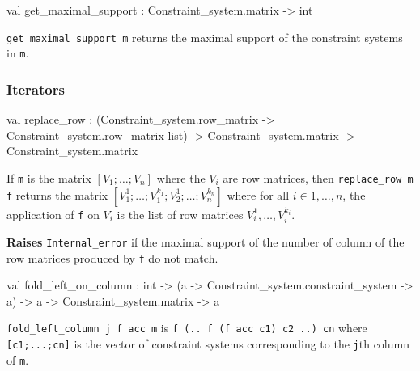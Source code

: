 \begin{ocamldocsigend}
\begin{ocamldocdescription}
\end{ocamldocdescription}


\label{val:Constraint-underscoresystem.Matrix.get-underscoremaximal-underscoresupport}\begin{ocamldoccode}
val get_maximal_support : Constraint_system.matrix -> int
\end{ocamldoccode}
\begin{ocamldocdescription}
{\tt{get\_maximal\_support m}} returns the maximal support of the constraint systems in {\tt{m}}.


\end{ocamldocdescription}


\subsubsection{Iterators}


\label{val:Constraint-underscoresystem.Matrix.replace-underscorerow}\begin{ocamldoccode}
val replace_row :
  (Constraint_system.row_matrix -> Constraint_system.row_matrix list) ->
  Constraint_system.matrix -> Constraint_system.matrix
\end{ocamldoccode}
\begin{ocamldocdescription}
If {\tt{m}} is the matrix $[V_1;\ldots;V_n]$ where the $V_i$ are row matrices,  then 
      {\tt{replace\_row m f}} returns the matrix $[V^1_1; \ldots; V^{k_1}_1; V^1_2; \ldots; V^{k_n}_n]$
      where for all $i \in {1, \ldots, n}$,  the application of {\tt{f}} on $V_i$ is the
      list of row matrices $V^1_i, \ldots, V^{k_i}_i$. 

{\bf Raises} {\tt{Internal\_error}} if the maximal support of the number of column of the row matrices produced by {\tt{f}} do not match.


\end{ocamldocdescription}


\label{val:Constraint-underscoresystem.Matrix.fold-underscoreleft-underscoreon-underscorecolumn}\begin{ocamldoccode}
val fold_left_on_column :
  int ->
  ({\textquotesingle}a -> Constraint_system.constraint_system -> {\textquotesingle}a) ->
  {\textquotesingle}a -> Constraint_system.matrix -> {\textquotesingle}a
\end{ocamldoccode}
\begin{ocamldocdescription}
{\tt{fold\_left\_column j f acc m}} is {\tt{f (.. f (f acc c1) c2 ..) cn}} where {\tt{[c1;...;cn]}} is the vector 
      of constraint systems corresponding to the {\tt{j}}th column of {\tt{m}}.



\end{ocamldocdescription}
\end{ocamldocsigend}
